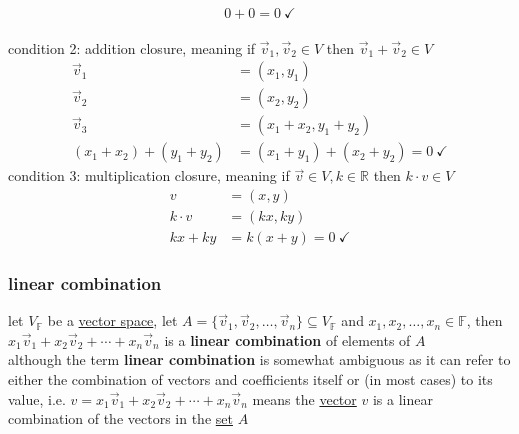 \documentclass[a4paper,12pt]{article}
\begin{document}
\begin{definition}
\begin{my_example}
\[ 0 + 0 = 0 \ \checkmark \]\\
condition 2: addition closure, meaning if \(\vec{v}_1, \vec{v}_2 \in V\) then \(\vec{v}_1 + \vec{v}_2 \in V\)\\
\begin{align*}
  \vec{v}_1 &= (x_1, y_1)\\
  \vec{v}_2 &= (x_2, y_2)\\
  \vec{v}_3 &= (x_1+x_2, y_1+y_2)\\
  (x_1 + x_2) + (y_1 + y_2) &= (x_1 + y_1) + (x_2 + y_2) = 0 \ \checkmark
\end{align*}
condition 3: multiplication closure, meaning if \(\vec{v} \in V, k \in \mathbb{R}\) then \(k \cdot v \in V\)\\
\begin{align*}
  v &= (x, y)\\
  k \cdot v &= (kx, ky)\\
  kx + ky &= k(x + y) = 0 \ \checkmark
\end{align*}
\end{my_example}
\end{definition}
\subsubsection{linear combination}
\label{sec:org0d4cbb4}
\begin{definition}
let \(V_\mathbb{F}\) be a \hyperref[sec:orgea93933]{vector space}, let \(A = \{\vec{v}_1, \vec{v}_2, \ldots, \vec{v}_n\} \subseteq V_\mathbb{F}\) and \(x_1, x_2, \ldots, x_n \in \mathbb{F}\), then \(x_1\vec{v}_1 + x_2\vec{v}_2 + \cdots + x_n\vec{v}_n\) is a \textbf{linear combination} of elements of \(A\)\\
although the term \textbf{linear combination} is somewhat ambiguous as it can refer to either the combination of vectors and coefficients itself or (in most cases) to its value, i.e. \(v = x_1\vec{v}_1 + x_2\vec{v}_2 + \cdots + x_n\vec{v}_n\) means the \hyperref[sec:org103a65e]{vector} \(v\) is a linear combination of the vectors in the \href{discrete_maths2.org}{set} \(A\)\\
\end{definition}
\end{document}
